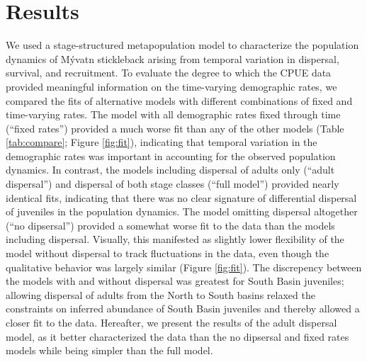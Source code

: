 \documentclass[11pt]{article}
\begin{document}

\section*{Results}

We used a stage-structured metapopulation model
to characterize the population dynamics of M\'{y}vatn stickleback
arising from temporal variation in dispersal, survival, and recruitment.
To evaluate the degree to which the CPUE data provided meaningful 
information on the time-varying demographic rates,
we compared the fits of alternative models
with different combinations of fixed and time-varying rates.
The model with all demographic rates fixed through time (``fixed rates'')
provided a much worse fit than any of the other models
(Table \ref{tab:compare}; Figure \ref{fig:fit}),
indicating that temporal variation in the demographic rates was important in accounting 
for the observed population dynamics.
In contrast, the models including dispersal of adults only (``adult dispersal'') 
and dispersal of both stage classes (``full model'') 
provided nearly identical fits, 
indicating that there was no clear signature of differential dispersal 
of juveniles in the population dynamics.
The model omitting dispersal altogether (``no dipsersal'') 
provided a somewhat worse fit to the data than the models including dispersal.
Visually, this manifested as slightly lower flexibility of the model without dispersal
to track fluctuations in the data, 
even though the qualitative behavior was largely similar (Figure \ref{fig:fit}).
The discrepency between the models with and without dispersal was greatest
for South Basin juveniles;
allowing dispersal of adults from the North to South basins relaxed the constraints 
on inferred abundance of South Basin juveniles and thereby allowed a closer fit to the data.
Hereafter, we present the results of the adult dispersal model,
as it better characterized the data than the no dipsersal and fixed rates
models while being simpler than the full model.
\end{document}

